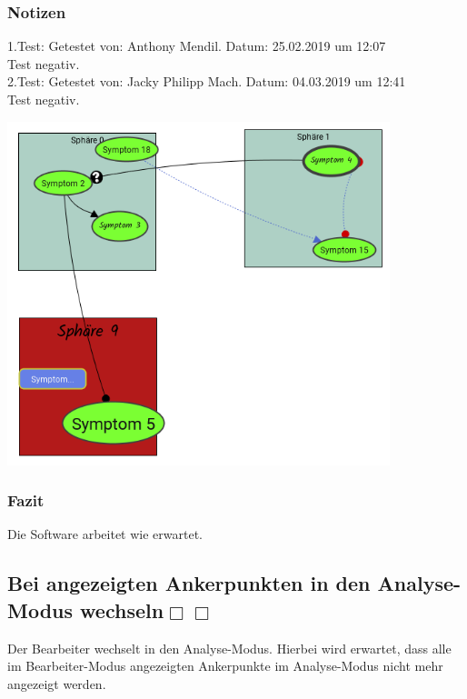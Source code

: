 \documentclass[enabledeprecatedfontcommands]{scrartcl}
\newcommand{\subsectiont}[2]{\subsection[#1]{#1{\normalsize\normalfont #2}}}
\newcommand{\leer}{$\Box$}
\begin{document}
\subsubsection{Notizen}
1.Test: Getestet von: Anthony Mendil. Datum: 25.02.2019 um 12:07 \\
Test negativ.\\
2.Test: Getestet von: Jacky Philipp Mach. Datum: 04.03.2019 um 12:41 \\
Test negativ.
\begin{center}
\includegraphics[height=10cm]{3_42.PNG}
\end{center}
\subsubsection{Fazit}
Die Software arbeitet wie erwartet.

\subsectiont{Bei angezeigten Ankerpunkten in den Analyse-Modus wechseln}{\dotfill\XBox\leer\leer}
Der Bearbeiter wechselt in den Analyse-Modus. Hierbei wird erwartet, dass alle im Bearbeiter-Modus angezeigten Ankerpunkte im Analyse-Modus nicht mehr angezeigt werden. 
\end{document}
